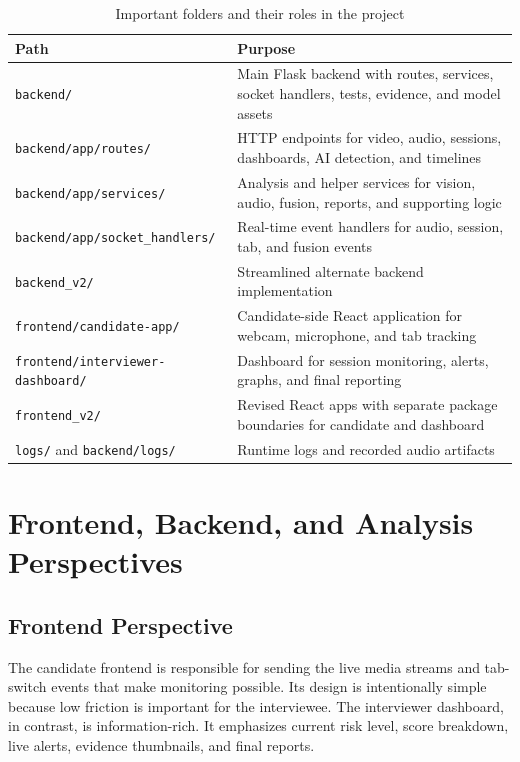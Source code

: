 \documentclass[12pt,a4paper]{extreport}
\begin{document}
\begin{table}[H]
\centering
\caption{Important folders and their roles in the project}
\label{tab:project_structure}
\begin{tabularx}{\textwidth}{p{3.2cm}X}
\toprule
\textbf{Path} & \textbf{Purpose}\\
\midrule
\texttt{backend/} & Main Flask backend with routes, services, socket handlers, tests, evidence, and model assets\\
\texttt{backend/app/routes/} & HTTP endpoints for video, audio, sessions, dashboards, AI detection, and timelines\\
\texttt{backend/app/services/} & Analysis and helper services for vision, audio, fusion, reports, and supporting logic\\
\texttt{backend/app/socket\_handlers/} & Real-time event handlers for audio, session, tab, and fusion events\\
\texttt{backend\_v2/} & Streamlined alternate backend implementation\\
\texttt{frontend/candidate-app/} & Candidate-side React application for webcam, microphone, and tab tracking\\
\texttt{frontend/interviewer-dashboard/} & Dashboard for session monitoring, alerts, graphs, and final reporting\\
\texttt{frontend\_v2/} & Revised React apps with separate package boundaries for candidate and dashboard\\
\texttt{logs/} and \texttt{backend/logs/} & Runtime logs and recorded audio artifacts\\
\bottomrule
\end{tabularx}
\end{table}

\section{Frontend, Backend, and Analysis Perspectives}
\subsection{Frontend Perspective}
The candidate frontend is responsible for sending the live media streams and tab-switch events that make monitoring possible. Its design is intentionally simple because low friction is important for the interviewee. The interviewer dashboard, in contrast, is information-rich. It emphasizes current risk level, score breakdown, live alerts, evidence thumbnails, and final reports.
\end{document}
